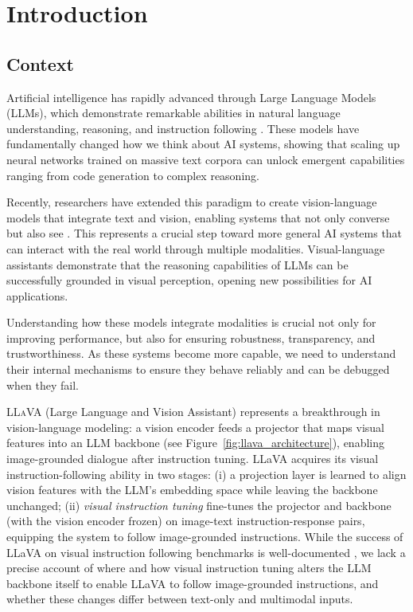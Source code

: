 \chapter{Introduction}\label{ch:introduction}

\section{Context}

Artificial intelligence has rapidly advanced through Large Language Models (LLMs), which demonstrate remarkable abilities in natural language understanding, reasoning, and instruction following \cite{minaeeLargeLanguageModels2025, zhaoSurveyLargeLanguage2025}. These models have fundamentally changed how we think about AI systems, showing that scaling up neural networks trained on massive text corpora can unlock emergent capabilities ranging from code generation to complex reasoning.

Recently, researchers have extended this paradigm to create vision-language models that integrate text and vision, enabling systems that not only converse but also see \cite{caffagniRevolutionMultimodalLarge2024, liSurveyStateArt2025}. This represents a crucial step toward more general AI systems that can interact with the real world through multiple modalities. Visual-language assistants demonstrate that the reasoning capabilities of LLMs can be successfully grounded in visual perception, opening new possibilities for AI applications.

Understanding how these models integrate modalities is crucial not only for improving performance, but also for ensuring robustness, transparency, and trustworthiness. As these systems become more capable, we need to understand their internal mechanisms to ensure they behave reliably and can be debugged when they fail.

\textsc{LLaVA} (Large Language and Vision Assistant) \cite{liuVisualInstructionTuning2023, liuImprovedBaselinesVisual2024} represents a breakthrough in vision-language modeling: a vision encoder feeds a projector that maps visual features into an LLM backbone (see Figure~\ref{fig:llava_architecture}), enabling image-grounded dialogue after instruction tuning. LLaVA acquires its visual instruction-following ability in two stages: (i) a projection layer is learned to align vision features with the LLM's embedding space while leaving the backbone unchanged; (ii) \emph{visual instruction tuning} fine-tunes the projector and backbone (with the vision encoder frozen) on image-text instruction-response pairs, equipping the system to follow image-grounded instructions. While the success of LLaVA on visual instruction following benchmarks is well-documented \cite{liuVisualInstructionTuning2023, liuImprovedBaselinesVisual2024}, we lack a precise account of where and how visual instruction tuning alters the LLM backbone itself to enable LLaVA to follow image-grounded instructions, and whether these changes differ between text-only and multimodal inputs.


